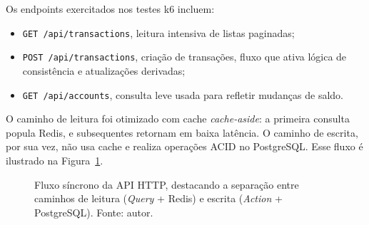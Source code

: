 Os endpoints exercitados nos testes k6 incluem:

\begin{itemize}
    \item \verb|GET /api/transactions|, leitura intensiva de listas paginadas;
    \item \verb|POST /api/transactions|, criação de transações, fluxo que ativa lógica de consistência e atualizações derivadas;
    \item \verb|GET /api/accounts|, consulta leve usada para refletir mudanças de saldo.
\end{itemize}

O caminho de leitura foi otimizado com cache \textit{cache-aside}: a primeira consulta popula Redis,
e subsequentes retornam em baixa latência.
O caminho de escrita, por sua vez, não usa cache e realiza operações ACID no PostgreSQL.
Esse fluxo é ilustrado na Figura~\ref{fig:fluxo-sincrono}.

\begin{figure}[htbp]
    \centering
    \caption{Fluxo síncrono da API HTTP, destacando a separação entre caminhos de leitura (\textit{Query} + Redis) e escrita (\textit{Action} + PostgreSQL). Fonte: autor.}
    \label{fig:fluxo-sincrono}
\end{figure}


